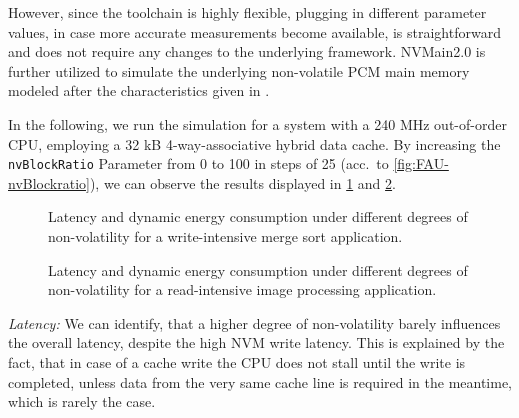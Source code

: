 However, since the toolchain is highly flexible, plugging in different parameter values, in case more accurate measurements become available, is straightforward and does not require any changes to the underlying framework.
NVMain2.0 is further utilized to simulate the underlying non-volatile PCM main memory modeled after the characteristics given in \cite{6176872}.
\par
In the following, we run the simulation for a system with a 240 MHz out-of-order CPU, employing a 32 kB 4-way-associative hybrid data cache.
By increasing the \texttt{nvBlockRatio} Parameter from 0 to 100 in steps of 25 (acc.\ to \cref{fig:FAU-nvBlockratio}), 
we can observe the results displayed in \cref{fig:FAUmsort} and \cref{fig:FAUip}.
\begin{figure}
	\begin{subfigure}{0.475\textwidth}
		
	\end{subfigure}
	\begin{subfigure}{0.475\textwidth}
		
	\end{subfigure}
    \caption{Latency and dynamic energy consumption under different degrees of non-volatility for a write-intensive merge sort application.}
    \label{fig:FAUmsort}
\end{figure}

\begin{figure}
	\begin{subfigure}{0.475\textwidth}
		
	\end{subfigure}
	\begin{subfigure}{0.475\textwidth}
		
	\end{subfigure}
    \caption{Latency and dynamic energy consumption under different degrees of non-volatility for a read-intensive image processing application.}
    \label{fig:FAUip}
\end{figure}

\textit{Latency:} We can identify, that a higher degree of non-volatility barely influences the overall latency, despite the high NVM write latency.
This is explained by the fact, that in case of a cache write the CPU does not stall until the write is completed, unless data from the very same cache line is required in the meantime, which is rarely the case.

